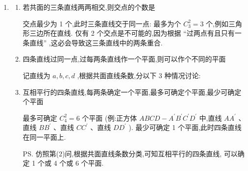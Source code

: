 \begin{enumerate}
    \item \begin{enumerate}
        \item 若共面的三条直线两两相交,则交点的个数是
        \begin{jieda}
            交点最少为 1 个,此时三条直线交于同一点: 最多为个 ${C}_{3}^{2} = 3$ 个,例如三角形三边所在直线. 仅有 2 个交点是不可能的,因为根据 “过两点有且只有一条直线” ,这必会导致这三条直线中的两条重合.
        \end{jieda}
        \item 四条直线过同一点,过每两条直线作一个平面,则可以作个不同的平面
        \begin{jieda}
            记直线为 $a,b,c,d$ ,根据共面直线条数,分以下 3 种情况讨论: 
        \end{jieda}
        \item 互相平行的四条直线,每两条确定一个平面,最多可确定个平面,最少可确定个平面
        \begin{jieda}
            最多可确定 ${C}_{4}^{2} = 6$ 个平面 (例:正方体 ${ABCD} - {A}^{\prime }{B}^{\prime }{C}^{\prime }{D}^{\prime }$ 中,直线 $A{A}^{\prime }$ 、直线 $B{B}^{\prime }$ 、直线 $C{C}^{\prime }$ 、直线 $D{D}^{\prime }$ ). 最少可确定 1 个平面,此时四条直线在同一平面上. 
            
            \ps 仿照第(2)问,根据共面直线条数分类,可知互相平行的四条直线, 可以确定 1 个或 4 个或 6 个平面.
        \end{jieda}
    \end{enumerate}
\end{enumerate}

